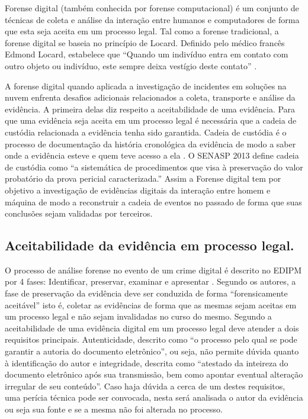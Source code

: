 Forense digital (também conhecida por forense computacional) é um conjunto de técnicas de coleta e análise da interação entre humanos e computadores de forma que esta seja aceita em um processo legal.
%
Tal como a forense tradicional, a forense digital se baseia no princípio de Locard. Definido pelo médico francês Edmond Locard, estabelece que ``Quando um indivíduo entra em contato com outro objeto ou indivíduo, este sempre deixa vestígio deste contato'' \cite{Ramos:2011}.

A forense digital quando aplicada a investigação de incidentes em soluções na nuvem enfrenta desafios adicionais relacionados a coleta, transporte e análise da evidência.
%
A primeira delas diz respeito a aceitabilidade de uma evidência. Para que uma evidência seja aceita em um processo legal é necessária que a cadeia de custódia relacionada a evidência tenha sido garantida.
%
Cadeia de custódia é o processo de documentação da história cronológica da evidência de modo a saber onde a evidência esteve e quem teve acesso a ela \cite{Ramos:2011}. O SENASP 2013 define cadeia de custódia como ``a sistemática de procedimentos que visa à preservação do valor probatório da prova pericial caracterizada.''
%
Assim a Forense digital tem por objetivo a investigação de evidências digitais da interação entre homem e máquina de modo a reconstruir a cadeia de eventos no passado de forma que suas conclusões sejam validadas por terceiros.


\subsection{Aceitabilidade da evidência em processo legal.}
\label{sec:credibilidadeaceitabilidadeevidencia}

O processo de análise forense no evento de um crime digital é descrito no EDIPM por 4 fases: Identificar, preservar, examinar e apresentar \cite{GrisposChallengesCloudComputing:2012}.
%
Segundo os autores, a fase de preservação da evidência deve ser conduzida de forma ``forensicamente aceitável'' isto é, coletar as evidências de forma que as mesmas sejam aceitas em um processo legal e não sejam invalidadas no curso do mesmo.
%
Segundo \cite{Ramos:2011} a aceitabilidade de uma evidência digital em um processo legal deve atender a dois requisitos principais. 
%
Autenticidade, descrito como ``o processo pelo qual se pode garantir a autoria do documento eletrônico'', ou seja, não permite dúvida quanto à identificação do autor e integridade, descrita como ``atestado da inteireza do documento eletrônico após sua transmissão, bem como apontar eventual alteração irregular de seu conteúdo''.
%
Caso haja dúvida a cerca de um destes requisitos, uma perícia técnica pode ser convocada, nesta será analisada o autor da evidência ou seja sua fonte e se a mesma não foi alterada no processo.


